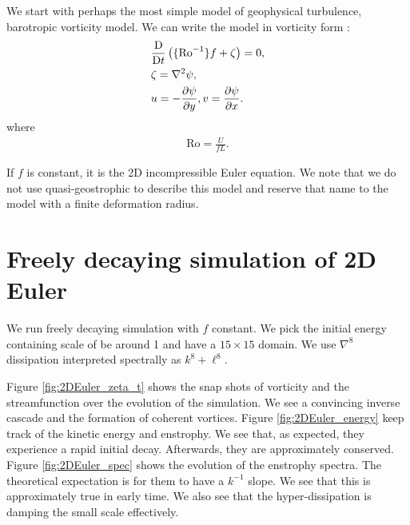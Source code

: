 \graphicspath{{Baro_vort/code/plot_snap/figs/}}

We start with perhaps the most simple model of geophysical turbulence, barotropic vorticity model. We can write the model in vorticity form \parencite[\S 4.2.1]{Vallis_17}:
\begin{align}
    &\frac{\mathrm{D}}{\mathrm{D} t}\left( \{\text{Ro}^{-1}\}f+\zeta \right) = 0,\\
    &\zeta = \nabla^2\psi,\\
    &u = -\frac{\partial\psi}{\partial y}, v = \frac{\partial\psi}{\partial x}.
\end{align}
where
\begin{align}
    \text{Ro} = \frac{U}{fL}.
\end{align}

If $f$ is constant, it is the 2D incompressible Euler equation. We note that we do not use quasi-geostrophic to describe this model and reserve that name to the model with a finite deformation radius.

\section{Freely decaying simulation of 2D Euler}\label{sec:2DEuler_freedecay}
We run freely decaying simulation with $f$ constant. We pick the initial energy containing scale of be around 1 and have a $15\times 15$ domain. We use $\nabla^8$ dissipation interpreted spectrally as $k^8+\ell^8$. 

Figure \ref{fig:2DEuler_zeta_t} shows the snap shots of vorticity and the streamfunction over the evolution of the simulation. We see a convincing inverse cascade and the formation of coherent vortices. Figure \ref{fig:2DEuler_energy} keep track of the kinetic energy and enstrophy. We see that, as expected, they experience a rapid initial decay. Afterwards, they are approximately conserved. Figure \ref{fig:2DEuler_spec} shows the evolution of the enstrophy spectra. The theoretical expectation is for them to have a $k^{-1}$ slope. We see that this is approximately true in early time. We also see that the hyper-dissipation is damping the small scale effectively.

